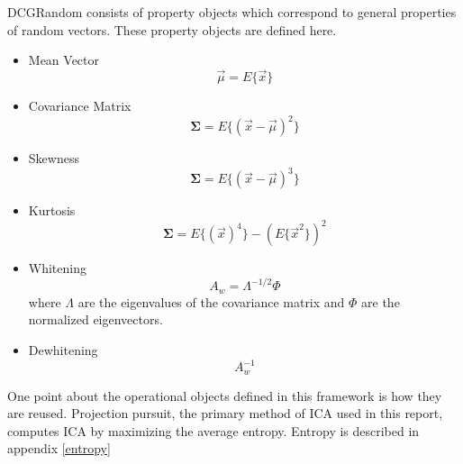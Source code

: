 \documentclass[12pt ]{article}
\begin{document}
DCGRandom consists of property objects which correspond to general properties of random vectors.  These property objects are defined here.  %
\begin{itemize}
\item Mean Vector
\begin{equation}
\vec{\mu} = E \{ \vec{x} \} 
\end{equation}

\item Covariance Matrix
\begin{equation}
\mathbf{ \Sigma} = E \{( \vec{x} - \vec{\mu})^2 \} 
\end{equation}
\item Skewness 
\begin{equation}
\mathbf{\Sigma} = E \{( \vec{x} - \vec{\mu})^3 \} 
\end{equation}
\item Kurtosis 
\begin{equation}
\mathbf{\Sigma} = E \{( \vec{x} )^4 \} - (E\{ \vec{x}^2 \} )^2 
\end{equation}

\item Whitening 
\begin{equation}
A_w = \Lambda ^{-1/2} \Phi 
\end{equation}
where $\Lambda$ are the eigenvalues of the covariance matrix and $\Phi$ are the normalized eigenvectors.  
\item Dewhitening
\begin{equation}
A_w ^{-1}
\end{equation}
\end{itemize}
One point about the operational objects defined in this framework is how they are reused.  %
Projection pursuit, the primary method of ICA used in this report, computes ICA by maximizing the average entropy.  Entropy is described in appendix \ref{entropy}
\end{document}
